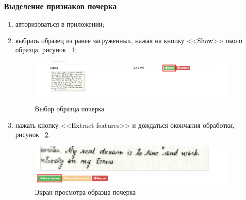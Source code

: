 \subsubsection{Выделение признаков почерка}
\label{sec:manpage:client_man:features}
\begin{enumerate}
    \item[1)] авторизоваться в приложении;
    \item[2)] выбрать образец из ранее загруженных, нажав на кнопку <<Show>> около образца, рисунок ~\ref{fig:manpage:client_man:show_button};
        \begin{figure}[ht]
            \centering
            \includegraphics[width=0.6\textheight]{figures/samples_open.png}
            \caption{Выбор образца почерка}
            \label{fig:manpage:client_man:show_button}
        \end{figure}
    \item[3)] нажать кнопку <<Extract features>> и дождаться окончания обработки, рисунок ~\ref{fig:manpage:client_man:extract_features}.
        \begin{figure}[ht]
            \centering
            \includegraphics[width=0.6\textheight]{figures/extract_features.png}
            \caption{Экран просмотра образца почерка}
            \label{fig:manpage:client_man:extract_features}
        \end{figure}
\end{enumerate}

